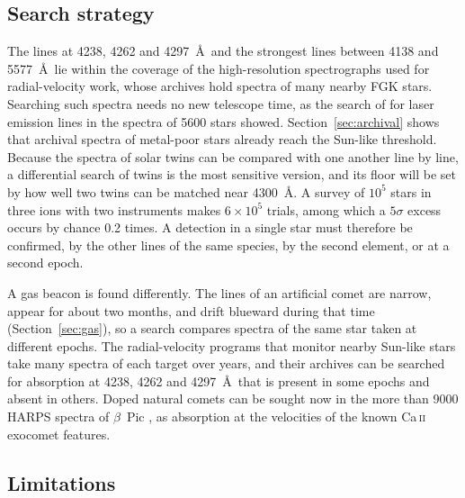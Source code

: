 \documentclass[final,5p]{elsarticle}
\begin{document}
\subsection{Search strategy}
\label{sec:search}

The  lines at 4238, 4262 and 4297~\AA\ and the strongest  lines between 4138 and 5577~\AA\ lie within the coverage of the high-resolution spectrographs used for radial-velocity work, whose archives hold spectra of many nearby FGK stars. Searching such spectra needs no new telescope time, as the search of \citet{Tellis2017} for laser emission lines in the spectra of 5600 stars showed. Section~\ref{sec:archival} shows that archival spectra of metal-poor stars already reach the Sun-like threshold. Because the spectra of solar twins can be compared with one another line by line, a differential search of twins is the most sensitive version, and its floor will be set by how well two twins can be matched near 4300~\AA. A survey of $10^{5}$ stars in three ions with two instruments makes $6\times10^{5}$ trials, among which a $5\sigma$ excess occurs by chance 0.2 times. A detection in a single star must therefore be confirmed, by the other lines of the same species, by the second element, or at a second epoch.

A gas beacon is found differently. The  lines of an artificial comet are narrow, appear for about two months, and drift blueward during that time (Section~\ref{sec:gas}), so a search compares spectra of the same star taken at different epochs. The radial-velocity programs that monitor nearby Sun-like stars take many spectra of each target over years, and their archives can be searched for absorption at 4238, 4262 and 4297~\AA\ that is present in some epochs and absent in others. Doped natural comets can be sought now in the more than 9000 HARPS spectra of $\beta$~Pic \citep{Hoeijmakers2025}, as  absorption at the velocities of the known Ca\,\textsc{ii} exocomet features.

\subsection{Limitations}
\label{sec:limitations}
\end{document}
